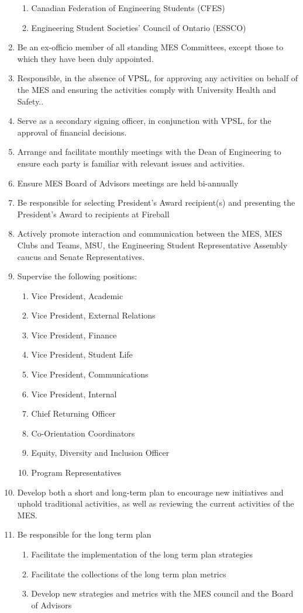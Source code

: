 \begin{enumerate}
  \begin{enumerate}
   \item
    Canadian Federation of Engineering Students (CFES)
   \item
    Engineering Student Societies' Council of Ontario (ESSCO)
  \end{enumerate}
 \item
  Be an ex-officio member of all standing MES Committees, except those
  to which they have been duly appointed.
 \item
  Responsible, in the absence of VPSL, for approving any activities on
  behalf of the MES and ensuring the activities comply with
  University Health and Safety..
 \item
  Serve as a secondary signing officer, in conjunction with VPSL, for
  the approval of financial decisions.
 \item
  Arrange and facilitate monthly meetings with the Dean of Engineering
  to ensure each party is familiar with relevant issues and activities.
 \item
  Ensure MES Board of Advisors meetings are held bi-annually
 \item
  Be responsible for selecting President's Award recipient(s) and
  presenting the President's Award to recipients at Fireball
 \item
  Actively promote interaction and communication between the MES, MES
  Clubs and Teams, MSU, the Engineering Student Representative Assembly
  caucus and Senate Representatives.
 \item
  Supervise the following positions:

  \begin{enumerate}
   \item
    Vice President, Academic
   \item
    Vice President, External Relations
   \item
    Vice President, Finance
   \item
    Vice President, Student Life
   \item
    Vice President, Communications
   \item
    Vice President, Internal
   \item
    Chief Returning Officer
   \item
    Co-Orientation Coordinators
   \item
    Equity, Diversity and Inclusion Officer
   \item
    Program Representatives
  \end{enumerate}
 \item
  Develop both a short and long-term plan to encourage new initiatives
  and uphold traditional activities, as well as reviewing the current
  activities of the MES.
 \item
  Be responsible for the long term plan

  \begin{enumerate}
   \item
    Facilitate the implementation of the long term plan strategies
   \item
    Facilitate the collections of the long term plan metrics
   \item
    Develop new strategies and metrics with the MES council and the
    Board of Advisors
  \end{enumerate}
\end{enumerate}